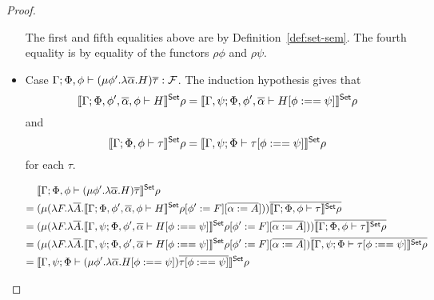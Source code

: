 \documentclass[acmsmall,review,anonymous]{acmart}
\theoremstyle{definition}
\newcommand{\F}{\mathcal{F}}
\newcommand{\set}{\mathsf{Set}}
\begin{document}
\begin{proof}
\begin{itemize}
    The first and fifth equalities above are by Definition~\ref{def:set-sem}. The fourth equality
    is by equality of the functors $\rho \phi$ and $\rho \psi$.  \\

  \item Case $\Gamma; \Phi, \phi \vdash (\mu \phi'. \lambda \ol\alpha. H)\ol\tau : \F$. 
      The induction hypothesis gives that 
      $$\setsem{\Gamma; \Phi, \phi', \ol{\alpha}, \phi \vdash H } \rho
        = \setsem{\Gamma, \psi; \Phi, \phi', \ol{\alpha} \vdash H[\phi :== \psi] } \rho$$ 
      and 
      $$\setsem{\Gamma; \Phi, \phi \vdash \tau } \rho
        = \setsem{\Gamma, \psi; \Phi \vdash \tau[\phi :== \psi] } \rho$$ 
      for each $\tau$. 

      \begin{align*}
        & \setsem{\Gamma; \Phi, \phi \vdash (\mu \phi'. \lambda \ol\alpha. H)\ol\tau } \rho \\
        = \; & (\mu (
            \lambda F. \lambda \ol{A}. \setsem{\Gamma; \Phi, \phi', \ol{\alpha}, \phi \vdash H} \rho[\phi' := F][\ol{\alpha := A}]
          )
        ) \ol{\setsem{ \Gamma; \Phi, \phi \vdash \tau} \rho} \\
        = \; & (\mu (
            \lambda F. \lambda \ol{A}. \setsem{\Gamma, \psi; \Phi, \phi', \ol{\alpha} \vdash H[\phi :== \psi]} \rho[\phi' := F][\ol{\alpha := A}]
          )
        ) \ol{\setsem{ \Gamma; \Phi, \phi \vdash \tau} \rho} \\
        = \; &  (\mu (
            \lambda F. \lambda \ol{A}. \setsem{\Gamma, \psi; \Phi, \phi', \ol{\alpha} \vdash H[\phi :== \psi]} \rho[\phi' := F][\ol{\alpha := A}]
          )
        \ol{\setsem{ \Gamma, \psi; \Phi \vdash \tau[\phi :== \psi]} \rho} \\
        = \; & \setsem{\Gamma, \psi; \Phi \vdash (\mu \phi'. \lambda \ol\alpha. H[\phi :== \psi]) \ol{\tau[\phi :== \psi]} } \rho \\

\end{align*}
\end{itemize}
\end{proof}
\end{document}
